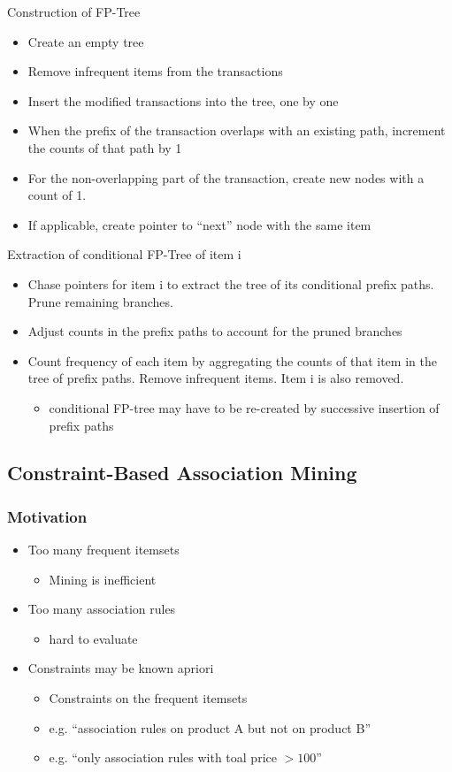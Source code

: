 \documentclass[../notes.tex]{subfiles}
\begin{document}
Construction of FP-Tree
\begin{itemize}
  \item Create an empty tree
  \item Remove infrequent items from the transactions
  \item Insert the modified transactions into the tree, one by one
  \item When the prefix of the transaction overlaps with an existing path, increment the counts of that path by 1
  \item For the non-overlapping part of the transaction, create new nodes with a count of 1. 
  \item If applicable, create pointer to ``next'' node with the same item
\end{itemize}

Extraction of conditional FP-Tree of item i
\begin{itemize}
  \item Chase pointers for item i to extract the tree of its conditional prefix paths. Prune remaining branches.
  \item Adjust counts in the prefix paths to account for the pruned branches
  \item Count frequency of each item by aggregating the counts of that item in the tree of prefix paths. Remove infrequent items. Item i is also removed.
    \begin{itemize}
      \item conditional FP-tree may have to be re-created by successive insertion of prefix paths
    \end{itemize}  
\end{itemize}

\subsection{Constraint-Based Association Mining}
\subsubsection{Motivation}
\begin{itemize}
  \item Too many frequent itemsets
    \begin{itemize}
      \item Mining is inefficient
    \end{itemize}
  \item Too many association rules
    \begin{itemize}
      \item hard to evaluate
    \end{itemize}  
  \item Constraints may be known apriori
    \begin{itemize}
      \item Constraints on the frequent itemsets
      \item e.g. ``association rules on product A but not on product B''
      \item e.g. ``only association rules with toal price $ > 100$''
    \end{itemize}  
\end{itemize}
\end{document}
